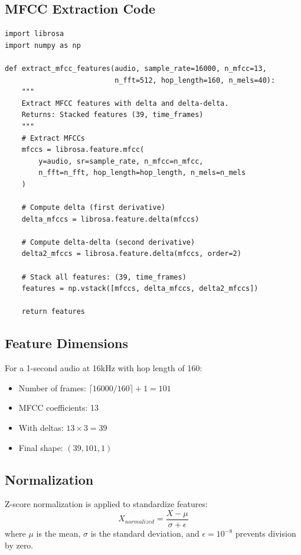 \documentclass[a4paper,12pt]{article}
\begin{document}
\subsection{MFCC Extraction Code}
\begin{lstlisting}[style=pythonstyle]
import librosa
import numpy as np

def extract_mfcc_features(audio, sample_rate=16000, n_mfcc=13, 
                          n_fft=512, hop_length=160, n_mels=40):
    """
    Extract MFCC features with delta and delta-delta.
    Returns: Stacked features (39, time_frames)
    """
    # Extract MFCCs
    mfccs = librosa.feature.mfcc(
        y=audio, sr=sample_rate, n_mfcc=n_mfcc,
        n_fft=n_fft, hop_length=hop_length, n_mels=n_mels
    )
    
    # Compute delta (first derivative)
    delta_mfccs = librosa.feature.delta(mfccs)
    
    # Compute delta-delta (second derivative)
    delta2_mfccs = librosa.feature.delta(mfccs, order=2)
    
    # Stack all features: (39, time_frames)
    features = np.vstack([mfccs, delta_mfccs, delta2_mfccs])
    
    return features
\end{lstlisting}

\subsection{Feature Dimensions}
For a 1-second audio at 16kHz with hop length of 160:
\begin{itemize}
    \item Number of frames: $\lceil 16000 / 160 \rceil + 1 = 101$
    \item MFCC coefficients: 13
    \item With deltas: $13 \times 3 = 39$
    \item Final shape: $(39, 101, 1)$
\end{itemize}

\subsection{Normalization}
Z-score normalization is applied to standardize features:
\begin{equation}
    X_{normalized} = \frac{X - \mu}{\sigma + \epsilon}
\end{equation}
where $\mu$ is the mean, $\sigma$ is the standard deviation, and $\epsilon = 10^{-8}$ prevents division by zero.
\end{document}
